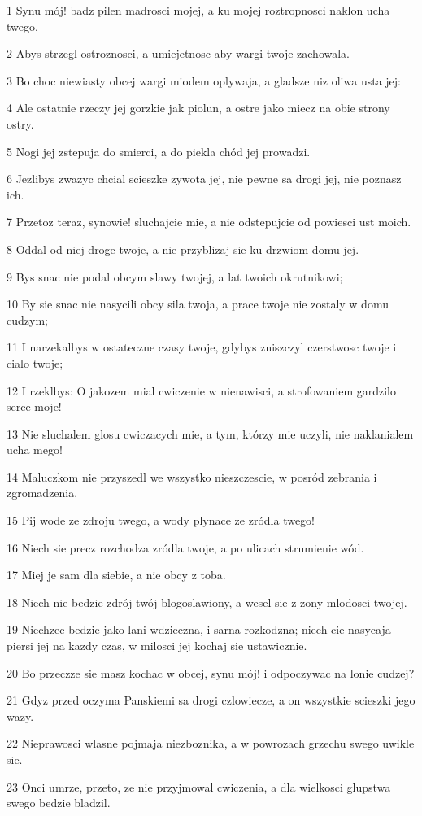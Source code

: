 \par 1 Synu mój! badz pilen madrosci mojej, a ku mojej roztropnosci naklon ucha twego,
\par 2 Abys strzegl ostroznosci, a umiejetnosc aby wargi twoje zachowala.
\par 3 Bo choc niewiasty obcej wargi miodem oplywaja, a gladsze niz oliwa usta jej:
\par 4 Ale ostatnie rzeczy jej gorzkie jak piolun, a ostre jako miecz na obie strony ostry.
\par 5 Nogi jej zstepuja do smierci, a do piekla chód jej prowadzi.
\par 6 Jezlibys zwazyc chcial scieszke zywota jej, nie pewne sa drogi jej, nie poznasz ich.
\par 7 Przetoz teraz, synowie! sluchajcie mie, a nie odstepujcie od powiesci ust moich.
\par 8 Oddal od niej droge twoje, a nie przyblizaj sie ku drzwiom domu jej.
\par 9 Bys snac nie podal obcym slawy twojej, a lat twoich okrutnikowi;
\par 10 By sie snac nie nasycili obcy sila twoja, a prace twoje nie zostaly w domu cudzym;
\par 11 I narzekalbys w ostateczne czasy twoje, gdybys zniszczyl czerstwosc twoje i cialo twoje;
\par 12 I rzeklbys: O jakozem mial cwiczenie w nienawisci, a strofowaniem gardzilo serce moje!
\par 13 Nie sluchalem glosu cwiczacych mie, a tym, którzy mie uczyli, nie naklanialem ucha mego!
\par 14 Maluczkom nie przyszedl we wszystko nieszczescie, w posród zebrania i zgromadzenia.
\par 15 Pij wode ze zdroju twego, a wody plynace ze zródla twego!
\par 16 Niech sie precz rozchodza zródla twoje, a po ulicach strumienie wód.
\par 17 Miej je sam dla siebie, a nie obcy z toba.
\par 18 Niech nie bedzie zdrój twój blogoslawiony, a wesel sie z zony mlodosci twojej.
\par 19 Niechzec bedzie jako lani wdzieczna, i sarna rozkodzna; niech cie nasycaja piersi jej na kazdy czas, w milosci jej kochaj sie ustawicznie.
\par 20 Bo przeczze sie masz kochac w obcej, synu mój! i odpoczywac na lonie cudzej?
\par 21 Gdyz przed oczyma Panskiemi sa drogi czlowiecze, a on wszystkie scieszki jego wazy.
\par 22 Nieprawosci wlasne pojmaja niezboznika, a w powrozach grzechu swego uwikle sie.
\par 23 Onci umrze, przeto, ze nie przyjmowal cwiczenia, a dla wielkosci glupstwa swego bedzie bladzil.

